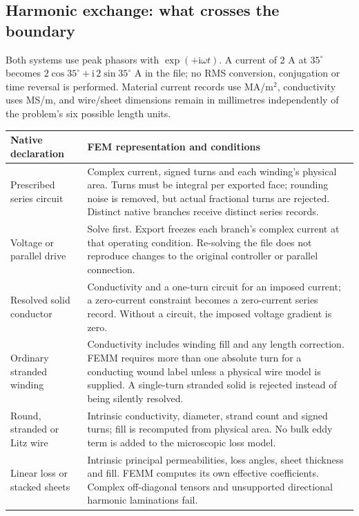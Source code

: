 \subsection{Harmonic exchange: what crosses the boundary}

Both systems use peak phasors with $\exp(+\mathrm i\omega t)$. A current of 2 A
at $35^\circ$ becomes $2\cos35^\circ+\mathrm i\,2\sin35^\circ$ A in the file;
no RMS conversion, conjugation or time reversal is performed. Material current
records use MA/m$^2$, conductivity uses MS/m, and wire/sheet dimensions remain in
millimetres independently of the problem's six possible length units.

\begin{center}\small
\begin{tabular}{p{.26\linewidth}p{.64\linewidth}}
\toprule
Native declaration & FEM representation and conditions\\
\midrule
Prescribed series circuit & Complex current, signed turns and each winding's
physical area. Turns must be integral per exported face; rounding noise is
removed, but actual fractional turns are rejected. Distinct native branches
receive distinct series records.\\
Voltage or parallel drive & Solve first. Export freezes each branch's complex
current at that operating condition. Re-solving the file does not reproduce
changes to the original controller or parallel connection.\\
Resolved solid conductor & Conductivity and a one-turn circuit for an imposed
current; a zero-current constraint becomes a zero-current series record.
Without a circuit, the imposed voltage gradient is zero.\\
Ordinary stranded winding & Conductivity includes winding fill and any length
correction. FEMM requires more than one absolute turn for a conducting wound
label unless a physical wire model is supplied. A single-turn stranded solid
is rejected instead of being silently resolved.\\
Round, stranded or Litz wire & Intrinsic conductivity, diameter, strand count
and signed turns; fill is recomputed from physical area. No bulk eddy term is
added to the microscopic loss model.\\
Linear loss or stacked sheets & Intrinsic principal permeabilities, loss angles,
sheet thickness and fill. FEMM computes its own effective coefficients. Complex
off-diagonal tensors and unsupported directional harmonic laminations fail.\\
\bottomrule
\end{tabular}\end{center}

